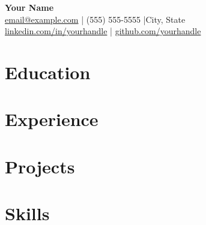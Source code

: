 \documentclass[11pt,letterpaper]{article}
\begin{document}
\begin{center}
  {\LARGE \textbf{Your Name}} \\[4pt]
  \href{mailto:email@example.com}{email@example.com} \quad|\quad
  (555) 555-5555 \quad|\quad City, State \\[2pt]
  \href{https://linkedin.com/in/yourhandle}{linkedin.com/in/yourhandle} \quad|\quad
  \href{https://github.com/yourhandle}{github.com/yourhandle}
\end{center}

\section*{Education}

\section*{Experience}

\section*{Projects}

\section*{Skills}
\end{document}
